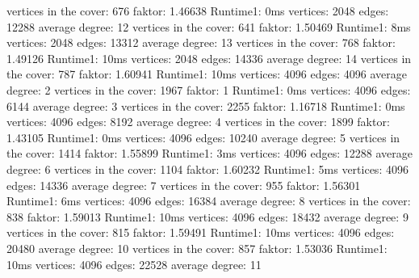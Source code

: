 \documentclass[12pt,onecolumn, notitlepage]{scrartcl}
\begin{document}
\newline vertices in the cover: 676 faktor: 1.46638 Runtime1: 0ms
\newline vertices: 2048 edges: 12288 average degree: 12 
\newline vertices in the cover: 641 faktor: 1.50469 Runtime1: 8ms
\newline vertices: 2048 edges: 13312 average degree: 13 
\newline vertices in the cover: 768 faktor: 1.49126 Runtime1: 10ms
\newline vertices: 2048 edges: 14336 average degree: 14 
\newline vertices in the cover: 787 faktor: 1.60941 Runtime1: 10ms \newline 
\newline vertices: 4096 edges: 4096 average degree: 2 
\newline vertices in the cover: 1967 faktor: 1 Runtime1: 0ms
\newline vertices: 4096 edges: 6144 average degree: 3 
\newline vertices in the cover: 2255 faktor: 1.16718 Runtime1: 0ms
\newline vertices: 4096 edges: 8192 average degree: 4 
\newline vertices in the cover: 1899 faktor: 1.43105 Runtime1: 0ms
\newline vertices: 4096 edges: 10240 average degree: 5 
\newline vertices in the cover: 1414 faktor: 1.55899 Runtime1: 3ms
\newline vertices: 4096 edges: 12288 average degree: 6 
\newline vertices in the cover: 1104 faktor: 1.60232 Runtime1: 5ms
\newline vertices: 4096 edges: 14336 average degree: 7 
\newline vertices in the cover: 955 faktor: 1.56301 Runtime1: 6ms
\newline vertices: 4096 edges: 16384 average degree: 8 
\newline vertices in the cover: 838 faktor: 1.59013 Runtime1: 10ms
\newline vertices: 4096 edges: 18432 average degree: 9 
\newline vertices in the cover: 815 faktor: 1.59491 Runtime1: 10ms
\newline vertices: 4096 edges: 20480 average degree: 10 
\newline vertices in the cover: 857 faktor: 1.53036 Runtime1: 10ms
\newline vertices: 4096 edges: 22528 average degree: 11 
\end{document}
